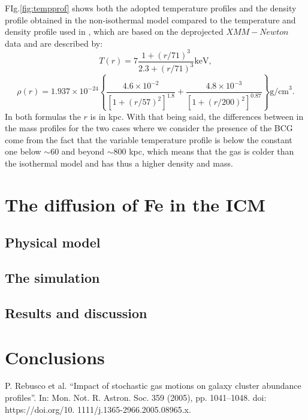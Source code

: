 \documentclass{article}
\begin{document}
FIg.\ref{fig:tempprof} shows both the adopted temperature profiles and the density profile obtained in the non-isothermal model compared to the temperature and density profile used in \cite{rebusco}, which are based on the deprojected $XMM-Newton$ data and are described by:
\begin{equation}
	T(r)=7\frac{1+(r/71)^{3}}{2.3+(r/71)^{3}}\text{keV},
\end{equation}
\begin{equation}
	\rho (r)=1.937\times 10^{-24}\left\{\frac{4.6\times 10^{-2}}{[1+(r/57)^{2}]^{1.8}}+\frac{4.8\times 10^{-3}}{[1+(r/200)^{2}]^{0.87}}\right\}\text{g/cm}^{3}.
\end{equation}
In both formulas the $r $ is in kpc. With that being said, the differences between in the mass profiles for the two cases where we consider the presence of the BCG come from the fact that the variable temperature profile is below the constant one below $\sim 60$ and beyond
$\sim 800$ kpc, which means that the gas is colder than the isothermal model and has thus a higher density and mass.

\section{The diffusion of Fe in the ICM}
\subsection{Physical model}


\subsection{The simulation}

\subsection{Results and discussion}


\section*{Conclusions}



\begin{thebibliography}{1}
	P. Rebusco et al. “Impact of stochastic gas motions on galaxy cluster abundance profiles”.
In: Mon. Not. R. Astron. Soc. 359 (2005), pp. 1041–1048. doi: https://doi.org/10.
1111/j.1365-2966.2005.08965.x.
\end{thebibliography}
\end{document}
